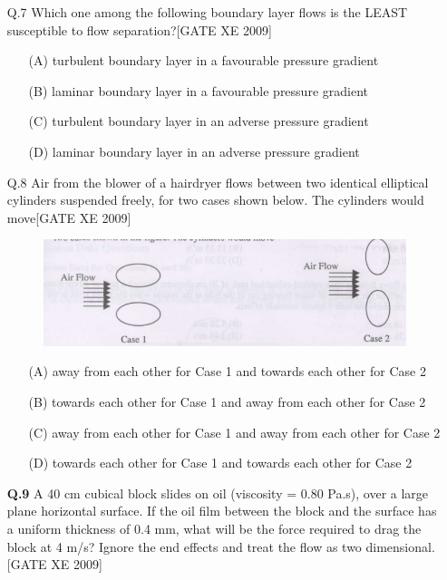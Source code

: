 \documentclass[journal,12pt,onecolumn]{IEEEtran}
\theoremstyle{remark}
\begin{document}
\begin{enumerate}
\begin{enumerate}
\item[Q.7] Which one among the following boundary layer flows is the LEAST susceptible to flow separation?\hfill[GATE XE 2009]
\begin{enumerate}
    \item[(A)] turbulent boundary layer in a favourable pressure gradient
    \item[(B)] laminar boundary layer in a favourable pressure gradient
    \item[(C)] turbulent boundary layer in an adverse pressure gradient
    \item[(D)] laminar boundary layer in an adverse pressure gradient
\end{enumerate}

\item[Q.8] Air from the blower of a hairdryer flows between two identical elliptical cylinders suspended freely, for two cases shown below. The cylinders would move\hfill[GATE XE 2009]

\begin{figure}[h]
\includegraphics[width=0.5\columnwidth]{figs/fig1.png}
\centering
\end{figure}
\begin{enumerate}
    \item[(A)] away from each other for Case 1 and towards each other for Case 2
    \item[(B)] towards each other for Case 1 and away from each other for Case 2
    \item[(C)] away from each other for Case 1 and away from each other for Case 2
    \item[(D)] towards each other for Case 1 and towards each other for Case 2
\end{enumerate}    




\item[\textbf{Q.9}] A 40 cm cubical block slides on oil (viscosity = 0.80 Pa.s), over a large plane horizontal surface. If the oil film between the block and the surface has a uniform thickness of 0.4 mm, what will be the force required to drag the block at 4 m/s? Ignore the end effects and treat the flow as two dimensional.\hfill[GATE XE 2009]\\
\begin{enumerate}
\end{enumerate}


\end{enumerate}
\end{enumerate}
\end{document}
